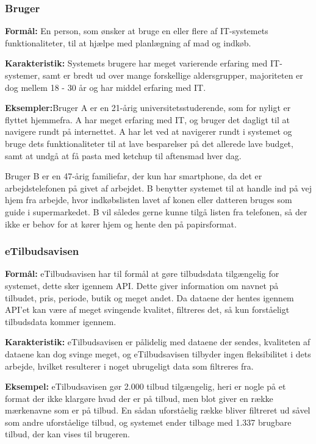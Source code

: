 \subsubsection*{Bruger}

\textbf{Formål:} En person, som ønsker at bruge en eller flere af IT-systemets funktionaliteter, til at hjælpe med planlægning af mad og indkøb.

\textbf{Karakteristik:} Systemets brugere har meget varierende erfaring med IT-systemer, samt er bredt ud over mange forskellige aldersgrupper, majoriteten er dog mellem 18 - 30 år og har middel erfaring med IT.

\textbf{Eksempler:}Bruger A er en 21-årig universitetsstuderende, som for nyligt er flyttet hjemmefra. A har meget erfaring med IT, og bruger det dagligt til at navigere rundt på internettet. 
A har let ved at navigerer rundt i systemet og bruge dets funktionaliteter til at lave besparelser på det allerede lave budget, samt at undgå at få pasta med ketchup til aftensmad hver dag.

Bruger B er en 47-årig familiefar, der kun har smartphone, da det er arbejdstelefonen på givet af arbejdet. 
B benytter systemet til at handle ind på vej hjem fra arbejde, hvor indkøbslisten lavet af konen eller datteren bruges som guide i supermarkedet. 
B vil således gerne kunne tilgå listen fra telefonen, så der ikke er behov for at kører hjem og hente den på papirsformat.

\subsubsection*{eTilbudsavisen}

\textbf{Formål:} eTilbudsavisen har til formål at gøre tilbudsdata tilgængelig for systemet, dette sker igennem API.
Dette giver information om navnet på tilbudet, pris, periode, butik og meget andet.
Da dataene der hentes igennem API'et kan være af meget svingende kvalitet, filtreres det, så kun forståeligt tilbudsdata kommer igennem.

\textbf{Karakteristik:} eTilbudsavisen er pålidelig med dataene der sendes, kvaliteten af dataene kan dog svinge meget, og eTilbudsavisen tilbyder ingen fleksibilitet i dets arbejde, hvilket resulterer i noget ubrugeligt data som filtreres fra.

\textbf{Eksempel:} eTilbudsavisen gør 2.000 tilbud tilgængelig, heri er nogle på et format der ikke klargøre hvad der er på tilbud, men blot giver en række mærkenavne som er på tilbud.
En sådan uforståelig række bliver filtreret ud såvel som andre uforståelige tilbud, og systemet ender tilbage med 1.337 brugbare tilbud, der kan vises til brugeren.

